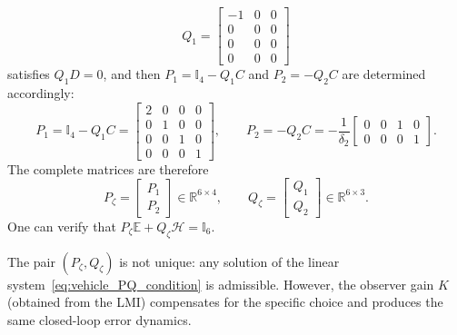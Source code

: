 \begin{equation}\label{eq:Q1_vehicle}
Q_1 = \begin{bmatrix}
-1 & 0 & 0 \\
0 & 0 & 0 \\
0 & 0 & 0 \\
0 & 0 & 0
\end{bmatrix}
\end{equation}
satisfies $Q_1 D = 0$, and then $P_1 = \mathbb{I}_4 - Q_1 C$ and $P_2 = -Q_2 C$ are determined accordingly:
\begin{equation}\label{eq:P1_vehicle}
P_1 = \mathbb{I}_4 - Q_1 C = 
\begin{bmatrix}
2 & 0 & 0 & 0 \\
0 & 1 & 0 & 0 \\
0 & 0 & 1 & 0 \\
0 & 0 & 0 & 1
\end{bmatrix}, \qquad
P_2 = -Q_2 C = -\frac{1}{\delta_2}
\begin{bmatrix}
0 & 0 & 1 & 0 \\
0 & 0 & 0 & 1
\end{bmatrix}.
\end{equation}
The complete matrices are therefore
\begin{equation}\label{eq:PQ_vehicle_full}
P_\zeta = \begin{bmatrix} P_1 \\ P_2 \end{bmatrix} \in \mathbb{R}^{6\times 4}, \qquad
Q_\zeta = \begin{bmatrix} Q_1 \\ Q_2 \end{bmatrix} \in \mathbb{R}^{6\times 3}.
\end{equation}
One can verify that $P_\zeta \mathbb{E} + Q_\zeta \mathcal{H} = \mathbb{I}_6$.

\begin{remark}
The pair $(P_\zeta,Q_\zeta)$ is not unique: any solution of the linear system~\eqref{eq:vehicle_PQ_condition} is admissible. However, the observer gain $K$ (obtained from the LMI) compensates for the specific choice and produces the same closed-loop error dynamics.
\end{remark}

